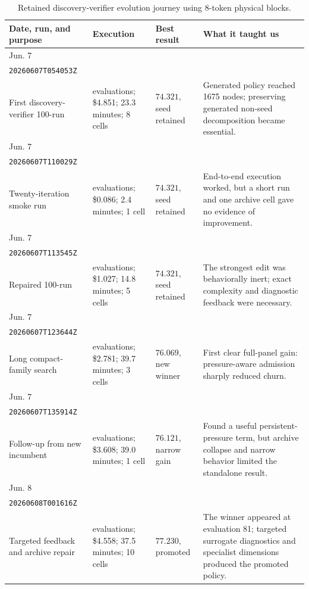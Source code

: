 \documentclass[11pt]{article}
\newcommand{\identifier}[1]{\nolinkurl{#1}}
\begin{document}
\begin{table}[H]
\centering
\footnotesize
\begin{tabularx}{\textwidth}{@{}>{\raggedright\arraybackslash}p{}
  >{\raggedright\arraybackslash}p{}
  >{\raggedright\arraybackslash}p{}
  >{\raggedright\arraybackslash}X@{}}
\toprule
\textbf{Date, run, and purpose} & \textbf{Execution} & \textbf{Best result} &
\textbf{What it taught us} \\
\midrule
Jun. 7\\\identifier{20260607T054053Z}\\First discovery-verifier 100-run &
98 evaluations; \$4.851; 23.3 minutes; 8 cells &
\(74.321\), seed retained &
Generated policy reached 1675 nodes; preserving generated non-seed decomposition
became essential. \\
\addlinespace
Jun. 7\\\identifier{20260607T110029Z}\\Twenty-iteration smoke run &
18 evaluations; \$0.086; 2.4 minutes; 1 cell &
\(74.321\), seed retained &
End-to-end execution worked, but a short run and one archive cell gave no evidence of
improvement. \\
\addlinespace
Jun. 7\\\identifier{20260607T113545Z}\\Repaired 100-run &
98 evaluations; \$1.027; 14.8 minutes; 5 cells &
\(74.321\), seed retained &
The strongest edit was behaviorally inert; exact complexity and diagnostic feedback
were necessary. \\
\addlinespace
Jun. 7\\\identifier{20260607T123644Z}\\Long compact-family search &
298 evaluations; \$2.781; 39.7 minutes; 3 cells &
\(76.069\), new winner &
First clear full-panel gain: pressure-aware admission sharply reduced churn. \\
\addlinespace
Jun. 7\\\identifier{20260607T135914Z}\\Follow-up from new incumbent &
298 evaluations; \$3.608; 39.0 minutes; 1 cell &
\(76.121\), narrow gain &
Found a useful persistent-pressure term, but archive collapse and narrow behavior
limited the standalone result. \\
\addlinespace
Jun. 8\\\identifier{20260608T001616Z}\\Targeted feedback and archive repair &
298 evaluations; \$4.558; 37.5 minutes; 10 cells &
\(77.230\), promoted &
The winner appeared at evaluation 81; targeted surrogate diagnostics and specialist
dimensions produced the promoted policy. \\
\bottomrule
\end{tabularx}
\caption{Retained discovery-verifier evolution journey using 8-token physical blocks.}
\label{tab:journey-runs}
\end{table}
\end{document}
